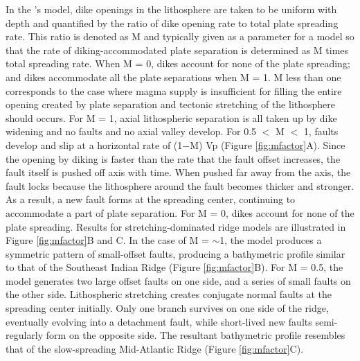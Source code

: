 \documentclass[letterpaper,12pt,notitle]{memphisthesis}                     %
\begin{document}
In the \citet{Buck2005}'s model, dike openings in the lithosphere are taken to be uniform with depth and quantified by the ratio of dike opening rate to total plate spreading rate. This ratio is denoted as M and typically given as a parameter for a model so that the rate of diking-accommodated plate separation is determined as M times total spreading rate. When M = 0, dikes account for none of the plate spreading; and dikes accommodate all the plate separations when M = 1. M less than one corresponds to the case where magma supply is insufficient for filling the entire opening created by plate separation and tectonic stretching of the lithosphere should occurs. For M = 1, axial lithospheric separation is all taken up by dike widening and no faults and no axial valley develop.  For 0.5 $<$ M $<$ 1, faults develop and slip at a horizontal rate of (1$-$M) Vp (Figure \ref{fig:mfactor}A). Since the opening by diking is faster than the rate that the fault offset increases, the fault itself is pushed off axis with time. When pushed far away from the axis, the fault locks because the lithosphere around the fault becomes thicker and stronger. As a result, a new fault forms at the spreading center, continuing to accommodate a part of plate separation. For M = 0, dikes account for none of the plate spreading. Results for stretching-dominated ridge models are illustrated in Figure \ref{fig:mfactor}B and C. In the case of M = $\sim$1, the model produces a symmetric pattern of small-offset faults, producing a bathymetric profile similar to that of the Southeast Indian Ridge (Figure \ref{fig:mfactor}B). For M = 0.5, the model generates two large offset faults on one side, and a series of small faults on the other side. Lithospheric stretching creates conjugate normal faults at the spreading center initially. Only one branch survives on one side of the ridge, eventually evolving into a detachment fault, while short-lived new faults semi-regularly form on the opposite side. The resultant bathymetric profile resembles that of the slow-spreading Mid-Atlantic Ridge (Figure \ref{fig:mfactor}C).
\end{document}
